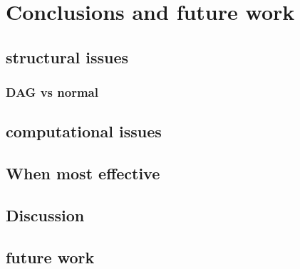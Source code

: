 \documentclass{article}
\begin{document}
\section{Conclusions and future work}
\subsection{structural issues}
\subsubsection{DAG vs normal}
\subsection{computational issues}
\subsubsection{}
\subsubsection{}
\subsection{}
\subsection{}
\subsection{When most effective}
\subsection{Discussion}
\subsection{future work}

\pagebreak
{}


\end{document}
